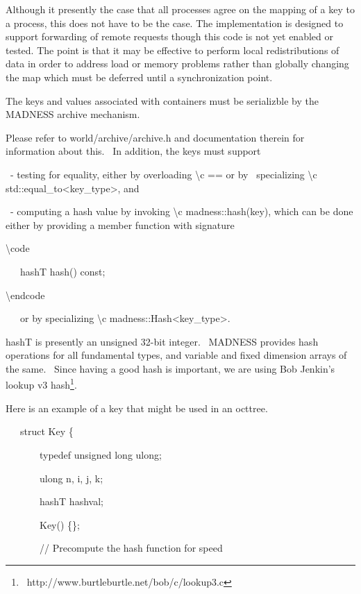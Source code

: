 \documentclass[letterpaper]{article}
\begin{document}
Although it presently the case that all processes agree on the mapping of a key to a process, this does not have to be
the case. The implementation is designed to support forwarding of remote requests though this code is not yet enabled
or tested. The point is that it may be effective to perform local redistributions of data in order to address load or
memory problems rather than globally changing the map which must be deferred until a synchronization point.

The keys and values associated with containers must be serializble by the MADNESS archive mechanism.

Please refer to world/archive/archive.h and documentation therein for information about this. \ In addition, the keys
must support

\ {}- testing for equality, either by overloading {\textbackslash}c == or by \ specializing {\textbackslash}c
std::equal\_to{\textless}key\_type{\textgreater}, and

\ {}- computing a hash value by invoking {\textbackslash}c madness::hash(key), which can be done either by providing a
member function with signature

{\textbackslash}code

\ \ \ hashT hash() const;

{\textbackslash}endcode

\ \ \ or by specializing {\textbackslash}c madness::Hash{\textless}key\_type{\textgreater}.

hashT is presently an unsigned 32-bit integer. \ MADNESS provides hash operations for all fundamental types, and
variable and fixed dimension arrays of the same. \ Since having a good hash is important, we are using Bob Jenkin's
{\textquotedbl}lookup v3{\textquotedbl} hash\footnote{\ http://www.burtleburtle.net/bob/c/lookup3.c}.

Here is an example of a key that might be used in an octtree.

{\ttfamily
\ \ \ struct Key \{}

{\ttfamily
\ \ \ \ \ \ \ typedef unsigned long ulong;}

{\ttfamily
\ \ \ \ \ \ \ ulong n, i, j, k;}

{\ttfamily
\ \ \ \ \ \ \ hashT hashval;}


\bigskip

{\ttfamily
\ \ \ \ \ \ \ Key() \{\};}


\bigskip

{\ttfamily
\ \ \ \ \ \ \ // Precompute the hash function for speed}
\end{document}
